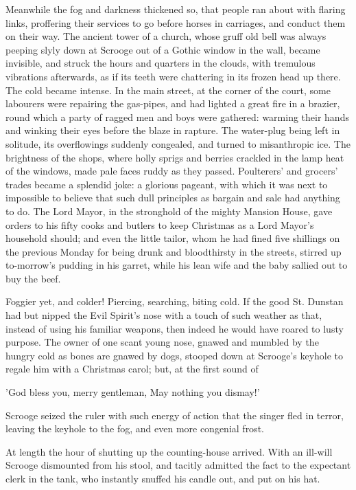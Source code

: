 Meanwhile the fog and darkness thickened so, that people ran about with
flaring links, proffering their services to go before horses in
carriages, and conduct them on their way. The ancient tower of a church,
whose gruff old bell was always peeping slyly down at Scrooge out of a
Gothic window in the wall, became invisible, and struck the hours and
quarters in the clouds, with tremulous vibrations afterwards, as if its
teeth were chattering in its frozen head up there. The cold became
intense. In the main street, at the corner of the court, some labourers
were repairing the gas-pipes, and had lighted a great fire in a brazier,
round which a party of ragged men and boys were gathered: warming their
hands and winking their eyes before the blaze in rapture. The water-plug
being left in solitude, its overflowings suddenly congealed, and turned
to misanthropic ice. The brightness of the shops, where holly sprigs and
berries crackled in the lamp heat of the windows, made pale faces ruddy
as they passed. Poulterers' and grocers' trades became a splendid joke:
a glorious pageant, with which it was next to impossible to believe that
such dull principles as bargain and sale had anything to do. The Lord
Mayor, in the stronghold of the mighty Mansion House, gave orders to his
fifty cooks and butlers to keep Christmas as a Lord Mayor's household
should; and even the little tailor, whom he had fined five shillings on
the previous Monday for being drunk and bloodthirsty in the streets,
stirred up to-morrow's pudding in his garret, while his lean wife and
the baby sallied out to buy the beef.

Foggier yet, and colder! Piercing, searching, biting cold. If the good
St. Dunstan had but nipped the Evil Spirit's nose with a touch of such
weather as that, instead of using his familiar weapons, then indeed he
would have roared to lusty purpose. The owner of one scant young nose,
gnawed and mumbled by the hungry cold as bones are gnawed by dogs,
stooped down at Scrooge's keyhole to regale him with a Christmas carol;
but, at the first sound of

  'God bless you, merry gentleman,
  May nothing you dismay!'

Scrooge seized the ruler with such energy of action that the singer fled
in terror, leaving the keyhole to the fog, and even more congenial
frost.

At length the hour of shutting up the counting-house arrived. With an
ill-will Scrooge dismounted from his stool, and tacitly admitted the
fact to the expectant clerk in the tank, who instantly snuffed his
candle out, and put on his hat.

